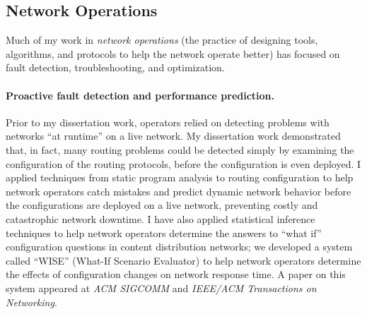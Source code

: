\documentclass{article}
\begin{document}


\subsection*{Network Operations}


Much of my work in {\em network operations} (the practice of designing
tools, algorithms, and protocols to help the network operate better) has
focused on fault detection, troubleshooting, and optimization.  

\paragraph{Proactive fault detection and performance prediction.}
Prior to my dissertation work, operators relied on detecting problems
with networks ``at runtime'' on a live network.  My dissertation work
demonstrated that, in fact, many routing problems could be detected
simply by examining the configuration of the routing protocols, before
the configuration is even deployed.  I applied techniques from static
program analysis to routing configuration to help network operators
catch mistakes and predict dynamic network behavior before the
configurations are deployed on a live network, preventing costly and
catastrophic network downtime.  I have also applied statistical inference
techniques to help network operators determine the answers to ``what
if'' configuration questions in content distribution networks; we
developed a system called ``WISE'' (What-If Scenario Evaluator) to help
network operators determine the effects of configuration changes on
network response time.  A paper on this system appeared at {\em ACM
SIGCOMM} and {\em IEEE/ACM
Transactions on Networking}.
\end{document}
